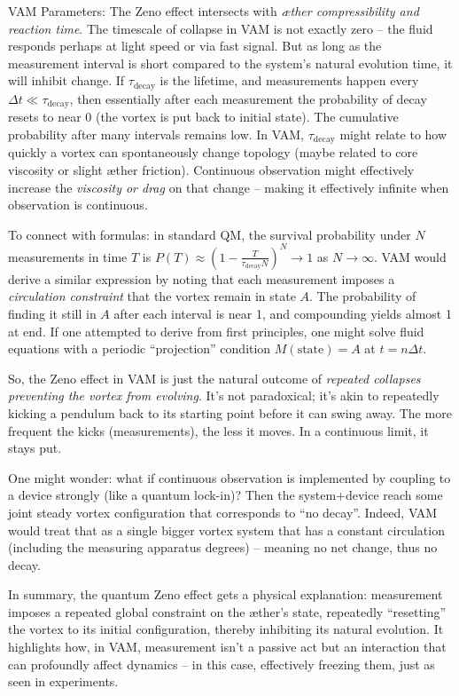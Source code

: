 \documentclass[a4paper, aps,preprint,superscriptaddress, 12pt]{revtex4}
\begin{document}
VAM Parameters: The Zeno effect intersects with \textit{æther compressibility and reaction time}. The timescale of collapse in VAM is not exactly zero – the fluid responds perhaps at light speed or via fast signal. But as long as the measurement interval is short compared to the system’s natural evolution time, it will inhibit change. If $\tau_{\text{decay}}$ is the lifetime, and measurements happen every $\Delta t \ll \tau_{\text{decay}}$, then essentially after each measurement the probability of decay resets to near 0 (the vortex is put back to initial state). The cumulative probability after many intervals remains low. In VAM, $\tau_{\text{decay}}$ might relate to how quickly a vortex can spontaneously change topology (maybe related to core viscosity or slight æther friction). Continuous observation might effectively increase the \textit{viscosity or drag} on that change – making it effectively infinite when observation is continuous.


To connect with formulas: in standard QM, the survival probability under $N$ measurements in time $T$ is $P(T) \approx \left(1 - \frac{T}{\tau_{\text{decay}} N}\right)^N \to 1$ as $N\to\infty$. VAM would derive a similar expression by noting that each measurement imposes a \textit{circulation constraint} that the vortex remain in state $A$. The probability of finding it still in $A$ after each interval is near 1, and compounding yields almost 1 at end. If one attempted to derive from first principles, one might solve fluid equations with a periodic “projection” condition $M(\text{state})=A$ at $t = n\Delta t$.


So, the Zeno effect in VAM is just the natural outcome of \textit{repeated collapses preventing the vortex from evolving}. It’s not paradoxical; it’s akin to repeatedly kicking a pendulum back to its starting point before it can swing away. The more frequent the kicks (measurements), the less it moves. In a continuous limit, it stays put.


One might wonder: what if continuous observation is implemented by coupling to a device strongly (like a quantum lock-in)? Then the system+device reach some joint steady vortex configuration that corresponds to “no decay”. Indeed, VAM would treat that as a single bigger vortex system that has a constant circulation (including the measuring apparatus degrees) – meaning no net change, thus no decay.


In summary, the quantum Zeno effect gets a physical explanation: measurement imposes a repeated global constraint on the æther’s state, repeatedly “resetting” the vortex to its initial configuration, thereby inhibiting its natural evolution. It highlights how, in VAM, measurement isn’t a passive act but an interaction that can profoundly affect dynamics – in this case, effectively freezing them, just as seen in experiments.
\end{document}
